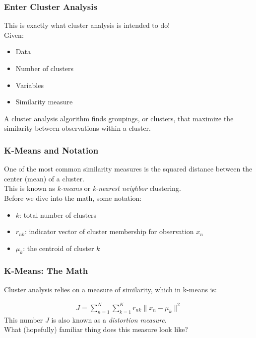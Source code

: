 \documentclass{beamer}
\begin{document}
\begin{frame}
\frametitle{Enter Cluster Analysis}
	This is exactly what cluster analysis is intended to do!\\
	Given:
	\begin{itemize}
		\item Data
		\item Number of clusters
		\item Variables
		\item Similarity measure
	\end{itemize}
	A cluster analysis algorithm finds groupings, or clusters, that maximize the similarity between observations within a cluster. 
\end{frame}

\begin{frame}
\frametitle{K-Means and Notation}
	One of the most common similarity measures is the squared distance between the center (mean) of a cluster. \\
	This is known as \textit{k-means} or \textit{k-nearest neighbor} clustering.\\
	Before we dive into the math, some notation:
	\begin{itemize}
		\item $k$: total number of clusters
		\item $r_{nk}$: indicator vector of cluster membership for observation $x_n$
		\item $\mu_k$: the centroid of cluster $k$
	\end{itemize}
\end{frame}

\begin{frame}
\frametitle{K-Means: The Math}
	Cluster analysis relies on a measure of similarity, which in k-means is:
	
	\begin{align*}
	J = \sum_{n=1}^{N}\sum_{k=1}^{K} r_{nk}  \| x_n - \mu_k \|^2
	\end{align*}
	This number $J$ is also known as a \textit{distortion measure}.\\
	What (hopefully) familiar thing does this measure look like?
\end{frame}
\end{document}
